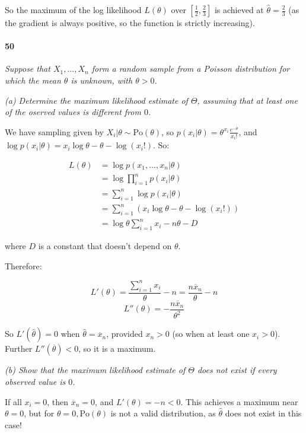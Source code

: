 \documentclass[a4paper]{article}
\begin{document}
                So the maximum of the log likelihood $L(\theta)$ over
                $\left[\frac{1}{2}, \frac{2}{3}\right]$ is achieved at $\widehat
                \theta = \frac{2}{3}$ (as the gradient is always positive, so
                the function is strictly increasing).

            \paragraph{50}
            \textit{Suppose that $X_1, ..., X_n$ form a random sample from a
            Poisson distribution for which the mean $\theta$ is unknown, with
            $\theta > 0$.}

            \textit{(a) Determine the maximum likelihood estimate of $\Theta$,
            assuming that at least one of the oserved values is different from
            $0$.}

                We have sampling given by $X_i | \theta \sim \text{Po}(\theta)$,
                so $p(x_i | \theta) = \theta^{x_i} \frac{e^{-\theta}}{x_i!}$,
                and $\log{p}(x_i | \theta) = x_i\log{\theta}- \theta -
                \log(x_i!)$. So:

                \begin{align*}
                    L(\theta) & = \log p(x_1, ..., x_n | \theta) \\
                    & = \log\prod_{i=1}^n p(x_i | \theta) \\
                    & = \sum_{i=1}^n \log p(x_i | \theta) \\
                    & = \sum_{i=1}^n (x_i\log\theta - \theta - \log(x_i!)) \\
                    & = \log\theta \sum_{i=1}^n x_i - n\theta - D
                \end{align*}

                where $D$ is a constant that doesn't depend on $\theta$.

                Therefore:

                \[
                    L'(\theta) = \frac{\sum\limits_{i=1}^n x_i}{\theta} - n =
                    \frac{n\overline x_n}{\theta} - n
                \]
                \[
                    L''(\theta) = -\frac{n\overline x_n}{\theta^2}
                \]

                So $L'(\widehat \theta) = 0$ when $\widehat \theta = \overline
                x_n$, provided $x_n > 0$ (so when at least one $x_i > 0$).
                Further $L''(\overline \theta) < 0$, so it is a maximum.

            \textit{(b) Show that the maximum likelihood estimate of $\Theta$
            does not exist if every observed value is $0$.}

                If all $x_i = 0$, then $\overline x_n = 0$, and $L'(\theta) = -n
                < 0$. This achieves a maximum near $\theta = 0$, but for $\theta
                = 0, \text{Po}(\theta)$ is not a valid distribution, as
                $\widehat \theta$ does not exist in this case!
\end{document}
